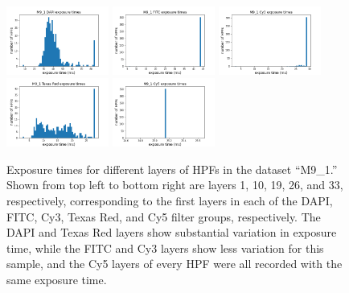 \documentclass[letterpaper,11pt]{article}
\begin{document}
\begin{figure}[!ht]
\centering
\includegraphics[width=0.3\textwidth]{images/introduction/exposure_times_M9_1_layer_1}
\includegraphics[width=0.3\textwidth]{images/introduction/exposure_times_M9_1_layer_10}
\includegraphics[width=0.3\textwidth]{images/introduction/exposure_times_M9_1_layer_19}
\includegraphics[width=0.3\textwidth]{images/introduction/exposure_times_M9_1_layer_26}
\includegraphics[width=0.3\textwidth]{images/introduction/exposure_times_M9_1_layer_33}
\caption{\footnotesize Exposure times for different layers of HPFs in the dataset ``M9\_1.'' Shown from top left to bottom right are layers 1, 10, 19, 26, and 33, respectively, corresponding to the first layers in each of the DAPI, FITC, Cy3, Texas Red, and Cy5 filter groups, respectively. The DAPI and Texas Red layers show substantial variation in exposure time, while the FITC and Cy3 layers show less variation for this sample, and the Cy5 layers of every HPF were all recorded with the same exposure time.}
\label{fig:exposure_time_variation_M9_1}
\end{figure}
\end{document}

